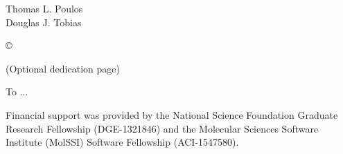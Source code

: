 




\othercommitteemembers
{
  Thomas L. Poulos\\
  Douglas J. Tobias
}


\copyrightdeclaration
{
  {\copyright} {\Degreeyear} \Authorname
}


\dedications
{
  (Optional dedication page)
  
  To ...
}

\acknowledgments
{
Financial support was provided by the National Science Foundation Graduate Research Fellowship (DGE-1321846) and the Molecular Sciences Software Institute (MolSSI) Software Fellowship (ACI-1547580).
}


\newcommand{\mypubentry}[3]{
  \begin{tabular*}{1\textwidth}{@{\extracolsep{\fill}}p{4.5in}r}
    \textbf{#1} & \textbf{#2} \\ 
    \multicolumn{2}{@{\extracolsep{\fill}}p{.95\textwidth}}{#3}\vspace{6pt} \\
  \end{tabular*}
}
\newcommand{\mysoftentry}[3]{
  \begin{tabular*}{1\textwidth}{@{\extracolsep{\fill}}lr}
    \textbf{#1} & \url{#2} \\
    \multicolumn{2}{@{\extracolsep{\fill}}p{.95\textwidth}}
    {\emph{#3}}\vspace{-6pt} \\
  \end{tabular*}
}

